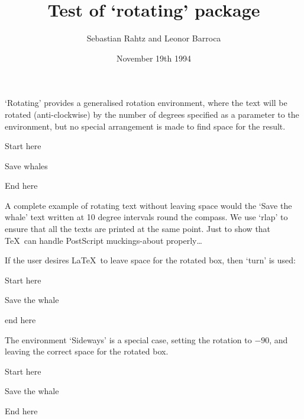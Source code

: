 \documentclass[twoside]{article}
\begin{document}
\title{Test of `rotating' package}
\author{Sebastian Rahtz and Leonor Barroca}
\date{November 19th 1994}
\maketitle

`Rotating' provides a generalised rotation environment, where the text
will be rotated (anti-clockwise) by the number of degrees specified as
a parameter to the environment, but no special arrangement is made to
find space for the result.
\begin{example}
Start here
\begin{rotate}{-56}
Save whales
\end{rotate}
End here
\end{example}

A complete example of rotating text without leaving space
would the `Save the whale' text
written at 10 degree intervals round the compass. We use
`rlap' to ensure that all the texts are printed at the same point.
Just to show that \TeX\ can handle PostScript muckings-about
properly\ldots
{}

If the user
desires \LaTeX\ to leave space for the rotated box, then `turn' is used:
\begin{example}
 Start here \begin{turn}{56}%
   Save the whale
  \end{turn} end here
\end{example}
The environment `Sideways' is a  special case, setting the rotation to $-90$,
and leaving the correct space for the rotated box. 
\begin{example}
Start here
\begin{sideways}%
Save the whale
\end{sideways}
End here
\end{example}
\end{document}
